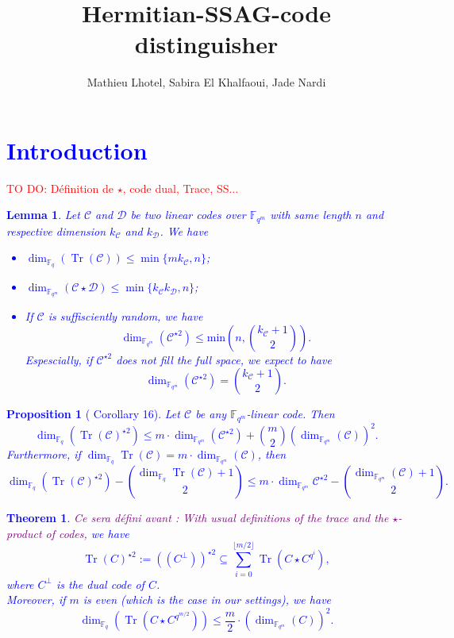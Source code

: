 \documentclass[a4paper]{article}
\title{Hermitian-SSAG-code distinguisher}
\author{Mathieu Lhotel, Sabira El Khalfaoui, Jade Nardi}
\date{}
\newtheorem{prop1}{Proposition}
\newtheorem{thm}{Theorem}
\newtheorem{lem1}{Lemma}
\newcommand{\calC}{\mathcal{C}}
\newcommand{\calD}{\mathcal{D}}
\newcommand{\Tr}{\operatorname{Tr}}
\newcommand{\fqm}{\mathbb{F}_{q^m}}
\newcommand{\fq}{\mathbb{F}_{q}}
\newcommand\jade[1]{\textcolor{purple}{#1}}
\newcommand\TODO[1]{\textcolor{red}{TO DO: #1}}
\begin{document}
\maketitle

\section{\textcolor{blue}{Introduction}}

\TODO{Définition de $\star$, code dual, Trace, SS...}



\textcolor{blue}{
	\begin{lem1} \label{known_bounds}
		Let $\calC$ and $\calD$ be two linear codes over $\fqm$ with same length $n$ and respective dimension $k_{\calC}$ and $k_{\calD}$. We have
		\begin{itemize}
			\item[$(1)$] $\dim_{\mathbb{F}_q}(\Tr(\calC)) \leq \min\{mk_{\calC},n\}$;
			\item[$(2)$] $\dim_{\fqm}(\calC \star \calD) \leq \min\{k_{\calC}k_{\calD},n\}$;
			\item[$(3)$] If $\calC$ is suffisciently random, we have
			\[ \dim_{\mathbb{F}_{q^m}}(\calC^{\star2}) \leq \mathrm{min}\left(n,\binom{k_{\calC}+1}{2}\right) . \]
			Espescially, if $\calC^{\star2}$ does not fill the full space, we expect to have 
			\[ \dim_{\mathbb{F}_{q^m}}(\calC^{\star2}) = \binom{k_{\calC}+1}{2}.\]
		\end{itemize}
	\end{lem1}
}
\textcolor{blue}{	
	\begin{prop1} [\cite{rocco} Corollary 16]\label{1st bound square of trace}
		Let $\calC$ be any $\fqm$-linear code. Then 
		\begin{equation} \label{bbbound}
			\dim_{\fq}(\Tr(\mathcal{C})^{\star2}) \leq m \cdot \dim_{\fqm}(\calC^{\star 2}) + \binom{m}{2} (\dim_{\fqm}(\calC))^2.
		\end{equation}
		Furthermore, if $\dim_{\fq} \Tr(\calC) = m \cdot \dim_{\fqm}(\calC)$, then 
		\[\dim_{\fq} (\Tr(\calC)^{\star 2}) - \binom{\dim_{\fq} \Tr(\calC)+1}{2} \leq m \cdot \dim_{\fqm} \calC^{\star 2} - \binom{\dim_{\fqm} (\calC)+1}{2}.\]
	\end{prop1}
}

\textcolor{blue}{\begin{thm} \label{th1}
		\jade{Ce sera défini avant : With usual definitions of the trace and the $\star$-product of codes,} we have 
		\[ \Tr(C)^{\star2} := ((C^{\perp}))^{\star2} \subseteq \sum\limits_{i=0}^{\lfloor{m/2} \rfloor} \Tr(C\star C^{q^i}),\]
		where $C^{\perp}$ is the dual code of $C$. \\
		Moreover, if $m$ is even (which is the case in our settings), we have 
		\[\dim_{\mathbb{F}_q}(\Tr(C \star C^{q^{m/2}})) \leq \frac{m}{2}\cdot (\dim_{\fqm}(C))^2.\]
	\end{thm}
}
\end{document}
